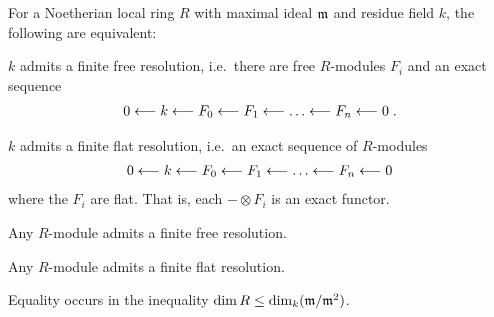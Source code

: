 \documentclass[a4paper,parskip=half,numbers=enddot, DIV=12]{scrreprt}
\begin{document}
\begin{thm}[Serre] 
    For a Noetherian local ring $R$ with maximal ideal $\mathfrak{m}$ and residue field $k$, the following are equivalent:
    \begin{alphanumerate}
    \item 
        $k$ admits a finite free resolution, i.e.\ there are free $R$-modules $F_i$ and an exact sequence
            \begin{align*}
                0 \lmorphism k \lmorphism F_0 \lmorphism F_1 \lmorphism \ldots \lmorphism F_n \lmorphism 0\;.
            \end{align*}
    \item 
        $k$ admits a finite flat resolution, i.e.\ an exact sequence of $R$-modules
            \begin{align*}
                0 \lmorphism k \lmorphism F_0 \lmorphism F_1 \lmorphism \ldots \lmorphism F_n \lmorphism 0
            \end{align*}
        where the $F_i$ are flat. That is, each $-\otimes F_i$ is an exact functor.
    \item 
        Any $R$-module admits a finite free resolution.
    \item 
        Any $R$-module admits a finite flat resolution.
    \item 
        Equality occurs in the inequality $\dim R \leq \dim_k (\mathfrak{m}/\mathfrak{m}^2)$.
    \end{alphanumerate}
\end{thm}
\end{document}
